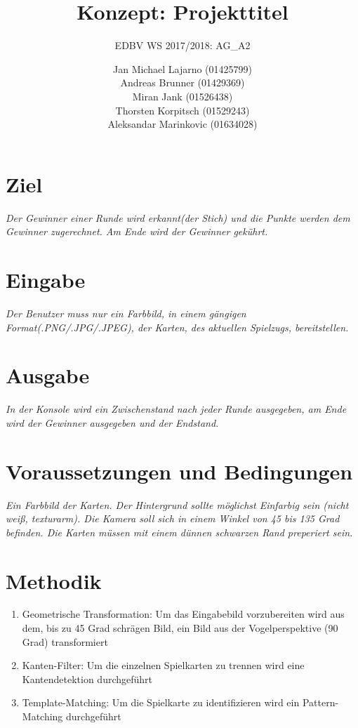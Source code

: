 \documentclass[deutsch]{scrartcl}
\begin{document}
\title{Konzept: Projekttitel} %

\subtitle{EDBV WS 2017/2018: AG\_A2} %


\author{Jan Michael Lajarno (01425799)\\
Andreas Brunner (01429369)\\
Miran Jank (01526438)\\
Thorsten Korpitsch (01529243)\\
Aleksandar Marinkovic (01634028)\\
}




\maketitle



\section{Ziel}
\textit{Der Gewinner einer Runde wird erkannt(der Stich) und die Punkte werden dem Gewinner zugerechnet. Am Ende wird der Gewinner gekührt.}
\section{Eingabe}
\textit{Der Benutzer muss nur ein Farbbild, in einem gängigen Format(.PNG/.JPG/.JPEG), der Karten, des aktuellen Spielzugs, bereitstellen.}
\section{Ausgabe}
\textit{In der Konsole wird ein Zwischenstand nach jeder Runde ausgegeben, am Ende wird der Gewinner ausgegeben und der Endstand.}
\section{Voraussetzungen und Bedingungen}
\textit{Ein Farbbild der Karten. Der Hintergrund sollte möglichst Einfarbig sein (nicht weiß, texturarm). Die Kamera soll sich in einem Winkel von 45 bis 135 Grad befinden. Die Karten müssen mit einem dünnen schwarzen Rand preperiert sein.}
\section{Methodik}
\begin{enumerate}
	\item Geometrische Transformation: Um das Eingabebild vorzubereiten wird aus dem, bis zu 45 Grad schrägen Bild, ein Bild aus der Vogelperspektive (90 Grad) transformiert
	\item Kanten-Filter: Um die einzelnen Spielkarten zu trennen wird eine Kantendetektion durchgeführt
	\item Template-Matching: Um die Spielkarte zu identifizieren wird ein Pattern-Matching durchgeführt
\end{enumerate}
\end{document}
